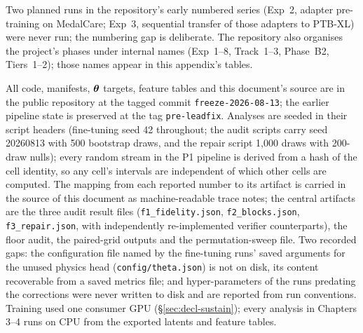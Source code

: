 Two planned runs in the repository's early numbered series (Exp~2, adapter pre-training on MedalCare; Exp~3, sequential transfer of those adapters to PTB-XL) were never run; the numbering gap is deliberate. The repository also organises the project's phases under internal names (Exp~1--8, Track~1--3, Phase~B2, Tiers~1--2); those names appear in this appendix's tables. 

All code, manifests, $\boldsymbol{\theta}$ targets, feature tables and this document's source are in the public repository at the tagged commit \texttt{freeze-2026-08-13}; the earlier pipeline state is preserved at the tag \texttt{pre-leadfix}. Analyses are seeded in their script headers (fine-tuning seed 42 throughout; the audit scripts carry seed 20260813 with 500 bootstrap draws, and the repair script 1{,}000 draws with 200-draw nulls); every random stream in the P1 pipeline is derived from a hash of the cell identity, so any cell's intervals are independent of which other cells are computed. The mapping from each reported number to its artifact is carried in the source of this document as machine-readable trace notes; the central artifacts are the three audit result files (\texttt{f1\_fidelity.json}, \texttt{f2\_blocks.json}, \texttt{f3\_repair.json}, with independently re-implemented verifier counterparts), the floor audit, the paired-grid outputs and the permutation-sweep file. Two recorded gaps: the configuration file named by the fine-tuning runs' saved arguments for the unused physics head (\texttt{config/theta.json}) is not on disk, its content recoverable from a saved metrics file; and hyper-parameters of the runs predating the corrections were never written to disk and are reported from run conventions. Training used one consumer GPU (\S\ref{sec:decl-sustain}); every analysis in Chapters 3--4 runs on CPU from the exported latents and feature tables. 
